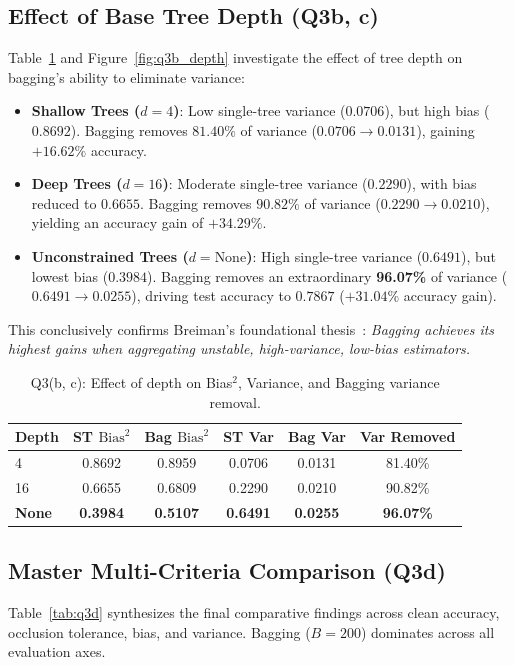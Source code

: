 \documentclass[10pt,twocolumn,letterpaper]{article}
\begin{document}
\subsection{Effect of Base Tree Depth (Q3b, c)}
Table~\ref{tab:q3b} and Figure~\ref{fig:q3b_depth} investigate the effect of tree depth on bagging's ability to eliminate variance:
\begin{itemize}
    \item \textbf{Shallow Trees ($d=4$)}: Low single-tree variance ($0.0706$), but high bias ($0.8692$). Bagging removes $81.40\%$ of variance ($0.0706 \to 0.0131$), gaining $+16.62\%$ accuracy.
    \item \textbf{Deep Trees ($d=16$)}: Moderate single-tree variance ($0.2290$), with bias reduced to $0.6655$. Bagging removes $90.82\%$ of variance ($0.2290 \to 0.0210$), yielding an accuracy gain of $+34.29\%$.
    \item \textbf{Unconstrained Trees ($d=\text{None}$)}: High single-tree variance ($0.6491$), but lowest bias ($0.3984$). Bagging removes an extraordinary \textbf{96.07\%} of variance ($0.6491 \to 0.0255$), driving test accuracy to $0.7867$ ($+31.04\%$ accuracy gain).
\end{itemize}
This conclusively confirms Breiman's foundational thesis~\cite{breiman1996bagging}: \textit{Bagging achieves its highest gains when aggregating unstable, high-variance, low-bias estimators.}

\begin{table}[t]
\centering
\small
\caption{Q3(b, c): Effect of depth on Bias$^2$, Variance, and Bagging variance removal.}
\label{tab:q3b}
\begin{tabular}{lccccc}
\toprule
Depth & ST $\text{Bias}^2$ & Bag $\text{Bias}^2$ & ST Var & Bag Var & Var Removed \\
\midrule
4 & 0.8692 & 0.8959 & 0.0706 & 0.0131 & 81.40\% \\
16 & 0.6655 & 0.6809 & 0.2290 & 0.0210 & 90.82\% \\
\textbf{None} & \textbf{0.3984} & \textbf{0.5107} & \textbf{0.6491} & \textbf{0.0255} & \textbf{96.07\%} \\
\bottomrule
\end{tabular}
\end{table}

\subsection{Master Multi-Criteria Comparison (Q3d)}
Table~\ref{tab:q3d} synthesizes the final comparative findings across clean accuracy, occlusion tolerance, bias, and variance. Bagging ($B=200$) dominates across all evaluation axes.
\end{document}

